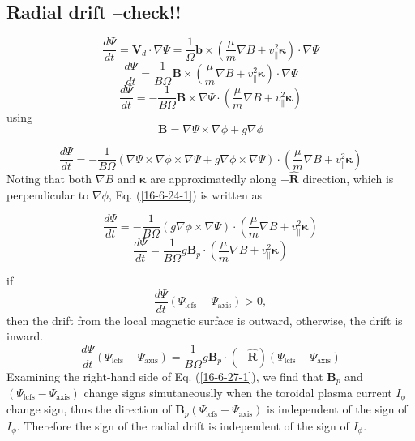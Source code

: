 \documentclass{article}
\newcommand{\tmop}[1]{\ensuremath{\operatorname{#1}}}
\begin{document}
\

\

\subsection{Radial drift --check!!}

\[ \frac{d \Psi}{d t} =\mathbf{V}_d \cdot \nabla \Psi = \frac{1}{\Omega}
   \mathbf{b} \times \left( \frac{\mu}{m} \nabla B + v_{\parallel}^2
   \mathbf{\kappa} \right) \cdot \nabla \Psi \]
\[ \frac{d \Psi}{d t} = \frac{1}{B \Omega} \mathbf{B} \times \left(
   \frac{\mu}{m} \nabla B + v_{\parallel}^2 \mathbf{\kappa} \right) \cdot
   \nabla \Psi \]
\[ \frac{d \Psi}{d t} = - \frac{1}{B \Omega} \mathbf{B} \times \nabla \Psi
   \cdot \left( \frac{\mu}{m} \nabla B + v_{\parallel}^2 \mathbf{\kappa}
   \right) \]
using
\[ \mathbf{B}= \nabla \Psi \times \nabla \phi + g \nabla \phi \]

\begin{equation}
  \label{16-6-24-1} \frac{d \Psi}{d t} = - \frac{1}{B \Omega} (\nabla \Psi
  \times \nabla \phi \times \nabla \Psi + g \nabla \phi \times \nabla \Psi)
  \cdot \left( \frac{\mu}{m} \nabla B + v_{\parallel}^2 \mathbf{\kappa}
  \right)
\end{equation}
Noting that both $\nabla B$ and $\mathbf{\kappa}$ are approximatedly along $-
\hat{\mathbf{R}}$ direction, which is perpendicular to $\nabla \phi$, Eq.
(\ref{16-6-24-1}) is written as


\[ \frac{d \Psi}{d t} = - \frac{1}{B \Omega} (g \nabla \phi \times \nabla
   \Psi) \cdot \left( \frac{\mu}{m} \nabla B + v_{\parallel}^2 \mathbf{\kappa}
   \right) \]
\[ \frac{d \Psi}{d t} = \frac{1}{B \Omega} g\mathbf{B}_p \cdot \left(
   \frac{\mu}{m} \nabla B + v_{\parallel}^2 \mathbf{\kappa} \right) \]


if
\[ \frac{d \Psi}{d t} (\Psi_{\tmop{lcfs}} - \Psi_{\tmop{axis}}) > 0, \]
then the drift from the local magnetic surface is outward, otherwise, the
drift is inward.
\[ \label{16-6-27-1} \frac{d \Psi}{d t} (\Psi_{\tmop{lcfs}} -
   \Psi_{\tmop{axis}}) = \frac{1}{B \Omega} g\mathbf{B}_p \cdot (-
   \hat{\mathbf{R}}) (\Psi_{\tmop{lcfs}} - \Psi_{\tmop{axis}}) \]
Examining the right-hand side of Eq. (\ref{16-6-27-1}), we find that
$\mathbf{B}_p$ and $(\Psi_{\tmop{lcfs}} - \Psi_{\tmop{axis}})$ change signs
simutaneouslly when the toroidal plasma current $I_{\phi}$ change sign, thus
the direction of $\mathbf{B}_p (\Psi_{\tmop{lcfs}} - \Psi_{\tmop{axis}})$ is
independent of the sign of $I_{\phi}$. Therefore the sign of the radial drift
is independent of the sign of $I_{\phi}$.
\end{document}

